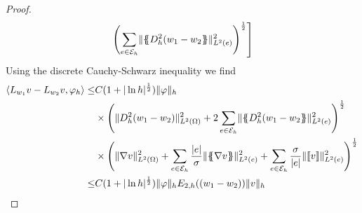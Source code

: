 \begin{proof}
\begin{align}
				\left. \left(\sum_{e \in \mathcal{E}_h} \lVert \{\!\!\{ D_h^2 (w_1-w_2 \}\!\!\} \rVert_{L^2(e)}^2 \right)^{\frac 1 2} 
			\right] \label{eq: difference estimate number two}
	\end{align}
	Using the discrete Cauchy-Schwarz inequality we find
	\begin{align}
	\bilin{L_{w_1}v- L_{w_2} v} {\varphi_h} 
		\leq& C (1+|\ln h|^{\frac 1 2})\eNorm{\varphi} 
		\nonumber \\
		&\times
			\left(
				\LTwonorm{\hess{(w_1 -w_2)}}^2 
				+ 2\sum_{e \in \edges} \LTwonormE{\average{\hess{(w_1-w_2}}}^2
			\right)^{\frac 1 2} \nonumber \\
	   	&\times
			\left(
			\LTwonorm{\nabla v}^2 
			+ \sum_{e \in \edges} \frac {|e|}\sigma \LTwonormE{\average{\nabla v}}^2
			+\sum_{e \in \edges} \frac \sigma {|e|}\LTwonormE{\jump {v}}^2
			\right)^{\frac 1 2} \nonumber \\
		\leq& C (1+|\ln h|^{\frac 1 2})\eNorm{\varphi} 	\epsilonTwo{{(w_1-w_2)}} \eNorm{v}
	\end{align}
 \phantom{blub}
\end{proof}

